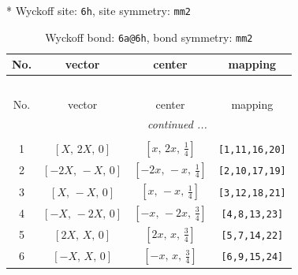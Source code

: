 \documentclass[fleqn,8pt]{jsarticle}
\begin{document}
* Wyckoff site: {\tt 6h}, site symmetry: {\tt mm2}
\renewcommand{\arraystretch}{1.2}
\begin{longtable}{cccc}
\caption{Wyckoff bond: {\tt 6a@6h}, bond symmetry: {\tt mm2}}
 \\
 \hline \hline
No. & vector & center & mapping \\ \hline \endfirsthead

\multicolumn{3}{l}{\tablename\ \thetable{}} \\
 \hline \hline
No. & vector & center & mapping \\ \hline \endhead

 \hline \hline
\multicolumn{3}{r}{\footnotesize\it continued ...} \\ \endfoot

 \hline \hline
\multicolumn{3}{r}{} \\ \endlastfoot

1 & $\left[ X,\, 2 X,\, 0 \right]$ & $\left[ x,\, 2 x,\, \frac{1}{4} \right]$ & {\tt [1,11,16,20]} \\ \hline
2 & $\left[ - 2 X,\, - X,\, 0 \right]$ & $\left[ - 2 x,\, - x,\, \frac{1}{4} \right]$ & {\tt [2,10,17,19]} \\ \hline
3 & $\left[ X,\, - X,\, 0 \right]$ & $\left[ x,\, - x,\, \frac{1}{4} \right]$ & {\tt [3,12,18,21]} \\ \hline
4 & $\left[ - X,\, - 2 X,\, 0 \right]$ & $\left[ - x,\, - 2 x,\, \frac{3}{4} \right]$ & {\tt [4,8,13,23]} \\ \hline
5 & $\left[ 2 X,\, X,\, 0 \right]$ & $\left[ 2 x,\, x,\, \frac{3}{4} \right]$ & {\tt [5,7,14,22]} \\ \hline
6 & $\left[ - X,\, X,\, 0 \right]$ & $\left[ - x,\, x,\, \frac{3}{4} \right]$ & {\tt [6,9,15,24]} \\
\end{longtable}
\renewcommand{\arraystretch}{1.2}
\end{document}
